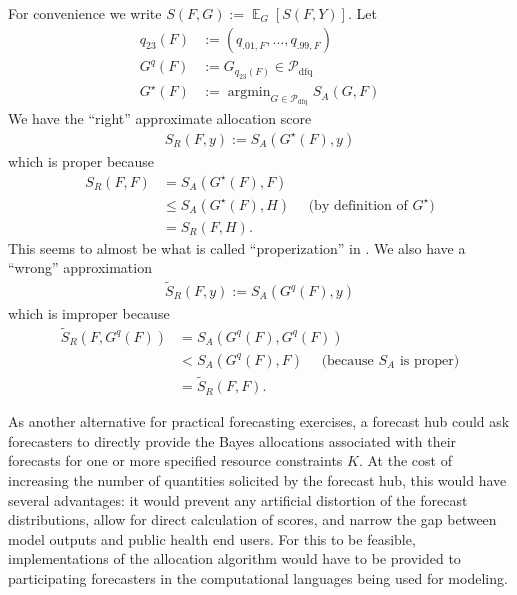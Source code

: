 \documentclass{article}
\DeclareMathOperator*{\argmin}{argmin}
\DeclareMathOperator{\Ex}{\mathbb{E}}
\begin{document}
For convenience we write $S(F,G) := \Ex_G[S(F,Y)]$. Let
\begin{align*}
q_{23}(F) &:= (q_{.01,F},\ldots,q_{.99,F}) \\
G^q(F) &:= G_{q_{23}(F)} \in \mathcal{P}_{\mathrm{dfq}} \\
G^{\star}(F) &:= \argmin_{G \in \mathcal{P}_{\mathrm{dfq}}} S_A(G,F)
\end{align*}
We have the ``right'' approximate allocation score
\begin{align*}
S_{R}(F,y):= S_A(G^{\star}(F),y)
\end{align*}
which is proper because 
\begin{align*}
S_R(F,F) &= S_A(G^{\star}(F), F) \\ 
&\leq S_A(G^{\star}(F), H) \quad \text{ (by definition of $G^{\star}$)} \\
&=S_R(F,H).
\end{align*}
This seems to almost be what is called ``properization'' in \cite{brehmer2020properization}.
We also have a ``wrong'' approximation 
\begin{align*}
\tilde{S}_R(F,y) := S_A(G^q(F),y)
\end{align*}
which is improper because
\begin{align*}
\tilde{S}_R(F,G^q(F)) &= S_A(G^q(F),G^q(F)) \\
 &<  S_A(G^q(F),F) \quad \text{ (because $S_A$ is proper)} \\
 &= \tilde{S}_R(F,F).
\end{align*}




As another alternative for practical forecasting exercises, a forecast hub could ask forecasters to directly provide the Bayes allocations associated with their forecasts for one or more specified resource constraints $K$. At the cost of increasing the number of quantities solicited by the forecast hub, this would have several advantages: it would prevent any artificial distortion of the forecast distributions, allow for direct calculation of scores, and narrow the gap between model outputs and public health end users. For this to be feasible, implementations of the allocation algorithm would have to be provided to participating forecasters in the computational languages being used for modeling.




\end{document}
